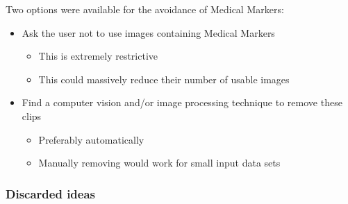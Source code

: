 Two options were available for the avoidance of Medical Markers:
\begin{itemize}
  \item Ask the user not to use images containing Medical Markers
  \begin{itemize}
    \item This is extremely restrictive
    \item This could massively reduce their number of usable images
  \end{itemize}
  \item Find a computer vision and/or image processing technique to remove these clips
  \begin{itemize}
    \item Preferably automatically
    \item Manually removing would work for small input data sets
  \end{itemize}
\end{itemize}

\subsubsection{Discarded ideas}

